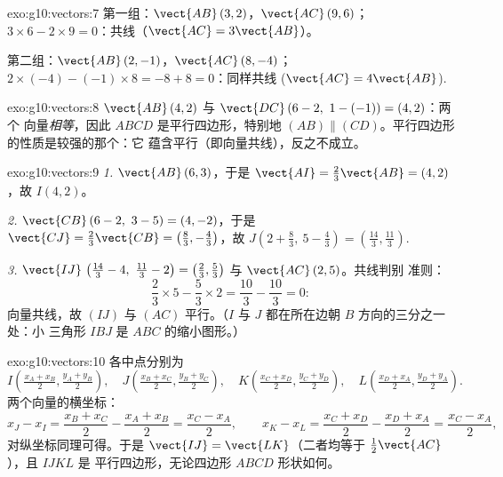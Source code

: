 \begin{solution}{exo:g10:vectors:7}
第一组：$\vect{AB}\,(3, 2)$，$\vect{AC}\,(9, 6)$；
$3 \times 6 - 2 \times 9 = 0$：共线（$\vect{AC} = 3\vect{AB}$）。

第二组：$\vect{AB}\,(2, -1)$，$\vect{AC}\,(8, -4)$；
$2 \times (-4) - (-1) \times 8 = -8 + 8 = 0$：同样共线
($\vect{AC} = 4\vect{AB}$).
\end{solution}

\begin{solution}{exo:g10:vectors:8}
$\vect{AB}\,(4, 2)$ 与 $\vect{DC}\,(6-2,\ 1-(-1)) = (4, 2)$：两个
向量\emph{相等}，因此 $ABCD$ 是平行四边形，特别地
$(AB) \parallel (CD)$。平行四边形的性质是较强的那个：它
蕴含平行（即向量共线），反之不成立。
\end{solution}

\begin{solution}{exo:g10:vectors:9}
\emph{1.} $\vect{AB}\,(6, 3)$，于是
$\vect{AI} = \frac23\vect{AB} = (4, 2)$，故 $I(4, 2)$。

\emph{2.} $\vect{CB}\,(6-2,\ 3-5) = (4, -2)$，于是
$\vect{CJ} = \frac23\vect{CB} = \left(\frac83, -\frac43\right)$，故
$J\left(2 + \frac83,\ 5 - \frac43\right) = \left(\frac{14}{3},
\frac{11}{3}\right)$.

\emph{3.} $\vect{IJ}\,\left(\frac{14}{3} - 4,\ \frac{11}{3} - 2\right) =
\left(\frac23, \frac53\right)$ 与 $\vect{AC}\,(2, 5)$。共线判别
准则：
\[
\frac23 \times 5 - \frac53 \times 2 = \frac{10}{3} - \frac{10}{3} = 0 :
\]
向量共线，故 $(IJ)$ 与 $(AC)$ 平行。（$I$ 与
$J$ 都在所在边朝 $B$ 方向的三分之一处：小
三角形 $IBJ$ 是 $ABC$ 的缩小图形。）
\end{solution}

\begin{solution}{exo:g10:vectors:10}
各中点分别为
\[
I\left(\tfrac{x_A + x_B}{2}, \tfrac{y_A + y_B}{2}\right), \quad
J\left(\tfrac{x_B + x_C}{2}, \tfrac{y_B + y_C}{2}\right), \quad
K\left(\tfrac{x_C + x_D}{2}, \tfrac{y_C + y_D}{2}\right), \quad
L\left(\tfrac{x_D + x_A}{2}, \tfrac{y_D + y_A}{2}\right).
\]
两个向量的横坐标：
\[
x_J - x_I = \frac{x_B + x_C}{2} - \frac{x_A + x_B}{2}
= \frac{x_C - x_A}{2},
\qquad
x_K - x_L = \frac{x_C + x_D}{2} - \frac{x_D + x_A}{2}
= \frac{x_C - x_A}{2},
\]
对纵坐标同理可得。于是
$\vect{IJ} = \vect{LK}$（二者均等于 $\frac12\vect{AC}$），且 $IJKL$ 是
平行四边形，无论四边形 $ABCD$ 形状如何。
\end{solution}

